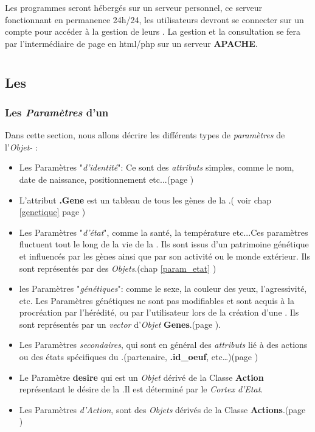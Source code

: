 \documentclass[french]{report}
\begin{document}
Les programmes seront hébergés sur un serveur personnel, ce serveur fonctionnant en permanence 24h/24, les utilisateurs devront se connecter sur un compte pour accéder à la gestion de leurs \CoCiX. La gestion et la consultation se fera par l'intermédiaire de page en html/php sur un serveur \textbf{APACHE}.

\part{\CoCiX}

\chapter{Les \CoCiX}
\section{Les \textit{Paramètres} d'un \CoCiX}\label{parametre}
Dans cette section, nous allons décrire les différents types de \textit{paramètres} de l'\textit{Objet-\CoCiX} :\\


\begin{itemize}
\item Les Paramètres "\textit{d'identité}": Ce sont des \textit{attributs} simples, comme le nom, date de naissance, positionnement etc...(page \pageref{identite})
\item L'attribut \textbf{.Gene} est un tableau de tous les gènes de la \CoCiX.( voir chap \ref{genetique} page \pageref{genome})

\item Les Paramètres "\textit{d'état}", comme la santé, la température etc...Ces paramètres fluctuent tout le long de la vie de la \CoCiX. Ils sont issus d'un patrimoine génétique et influencés par les gènes ainsi que par son activité ou le monde extérieur. Ils sont représentés par des  \textit{Objets}.(chap \ref{param_etat} \pageref{param_etat})

\item les Paramètres "\textit{génétiques}": comme le sexe, la couleur des yeux, l'agressivité, etc. Les Paramètres génétiques ne sont pas modifiables et sont acquis à la procréation par l'hérédité, ou par l'utilisateur lors de la création d'une \CoCiX. Ils sont représentés par un \textit{vector} d'\textit{Objet} \textbf{Genes}.(page \pageref{genetique}).


\item Les Paramètres \textit{secondaires}, qui sont en général des \textit{attributs} lié à des actions ou des états spécifiques du \CoCiX.(partenaire, \textbf{.id\_oeuf}, etc\dots)(page \pageref{param_second})

\item Le Paramètre \textbf{desire} qui est un \textit{Objet} dérivé de la Classe \textbf{Action} représentant le désire de la \CoCiX.Il est déterminé par le \textit{Cortex d'Etat}.

\item Les Paramètres \textit{d'Action}, sont des \textit{Objets} dérivés de la Classe \textbf{Actions}.(page \pageref{param_action})\\
\end{itemize}
\end{document}

